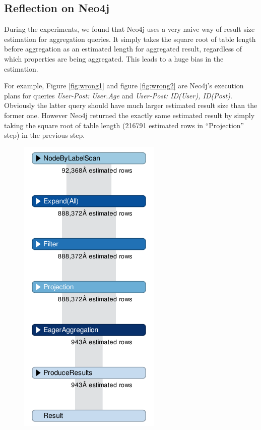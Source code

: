\subsection{Reflection on Neo4j}
During the experiments, we found that Neo4j uses a very naive way of result size estimation for aggregation queries. It simply takes the square root of table length before aggregation as an estimated length for aggregated result, regardless of which properties are being aggregated. This leads to a huge bias in the estimation. 

For example, Figure \ref{fig:wrong1} and figure \ref{fig:wrong2} are Neo4j's execution plans for queries \textit{User-Post: User.Age} and \textit{User-Post: ID(User), ID(Post)}. Obviously the latter query should have much larger estimated result size than the former one. However Neo4j returned the exactly same estimated result by simply taking the square root of table length (216791 estimated rows in ``Projection'' step) in the previous step.


\begin{figure}[H]
\centering
\includegraphics[scale=0.7]{"pic/wrong"}
\caption{}
\label{Execution plan for \textit{User-Post: User.Age}.}
\end{figure}

